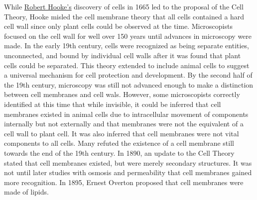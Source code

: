 While \href{https://en.wikipedia.org/wiki/Robert_Hooke}{Robert Hooke's} discovery of cells in 1665 led to the proposal of the Cell Theory, Hooke misled the cell membrane theory that all cells contained a hard cell wall since only plant cells could be observed at the time. Microscopists focused on the cell wall for well over 150 years until advances in microscopy were made. In the early 19th century, cells were recognized as being separate entities, unconnected, and bound by individual cell walls after it was found that plant cells could be separated. This theory extended to include animal cells to suggest a universal mechanism for cell protection and development. By the second half of the 19th century, microscopy was still not advanced enough to make a distinction between cell membranes and cell wals. However, some microscopists correctly identified at this time that while invisible, it could be inferred that cell membranes existed in animal cells due to intracellular movement of components internally but not externally and that membranes were not the equivalent of a cell wall to plant cell. It was also inferred that cell membranes were not vital components to all cells. Many refuted the existence of a cell membrane still towards the end of the 19th century. In 1890, an update to the Cell Theory stated that cell membranes existed, but were merely secondary structures. It was not until later studies with osmosis and permeability that cell membranes gained more recognition. In 1895, Ernest Overton proposed that cell membranes were made of lipids.

